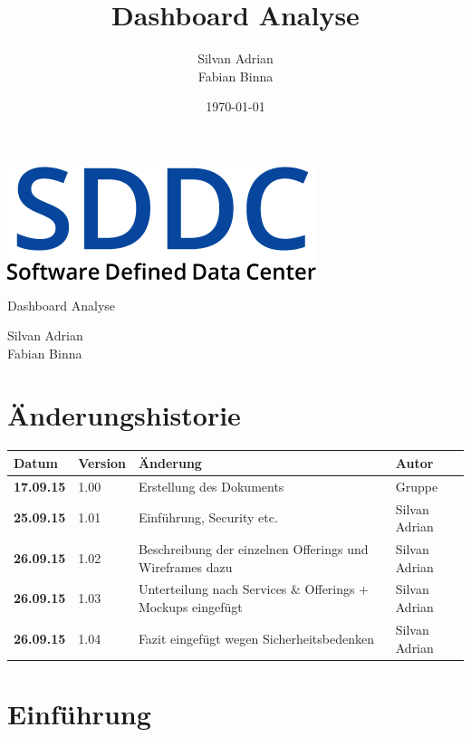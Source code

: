 \documentclass[11pt]{scrartcl}
\title{Dashboard Analyse}
\author{Silvan Adrian \\ Fabian Binna}
\date{\today{}}
\begin{document}
\def\arraystretch{1.5}
\begin{titlepage}
\begin{center}
\vspace{10em}
\includegraphics[scale=2]{SDDC}
\vspace{10em}
\end{center}
\begin{center}
\huge {Dashboard Analyse}
\end{center}
\begin{center}
\vspace{10em}
\LARGE {Silvan Adrian} \\
\LARGE {Fabian Binna}
\end{center}

\end{titlepage}

\newpage
\section{Änderungshistorie}
\begin{tabularx}{\linewidth}{l l X l}
\textbf{Datum} & \textbf{Version} & \textbf{Änderung}  & \textbf{Autor} \\
\hline
\textbf{17.09.15} & 1.00 & Erstellung des Dokuments & Gruppe \\
\textbf{25.09.15} & 1.01 & Einführung, Security etc. & Silvan Adrian \\
\textbf{26.09.15} & 1.02 & Beschreibung der einzelnen Offerings und Wireframes 
dazu & Silvan Adrian\\
\textbf{26.09.15} & 1.03 & Unterteilung nach Services \& Offerings + Mockups 
eingefügt  & Silvan Adrian\\
\textbf{26.09.15} & 1.04 & Fazit eingefügt wegen Sicherheitsbedenken  & Silvan Adrian\\
\end{tabularx}

\newpage
\tableofcontents
\newpage

\section{Einführung}
\end{document}
